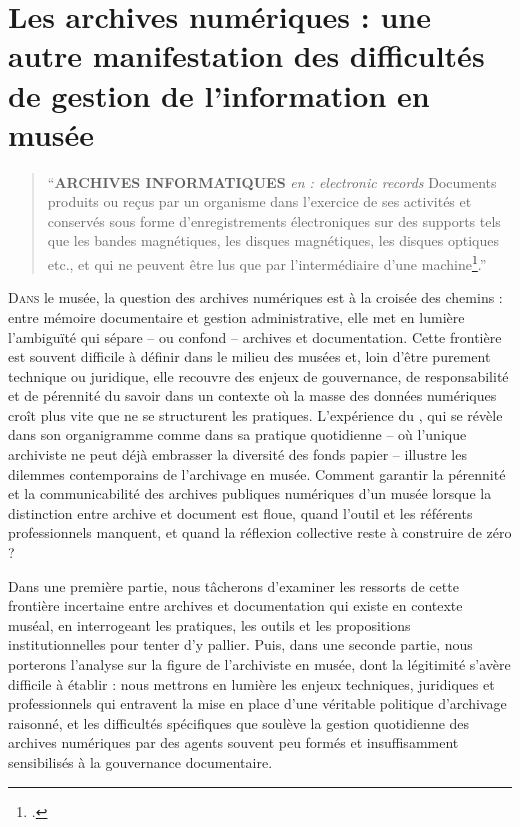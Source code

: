 \chapter[Les archives numériques]{\label{II-C}Les archives numériques : une autre manifestation des difficultés de gestion de l’information en musée }

\begin{quote}
	\enquote{\textbf{ARCHIVES INFORMATIQUES} \textit{en : electronic records}
		Documents produits ou reçus par un organisme dans l'exercice de
		ses activités et conservés sous forme d'enregistrements
		électroniques sur des supports tels que les bandes magnétiques,
		les disques magnétiques, les disques optiques etc., et qui ne
		peuvent être lus que par l’intermédiaire d’une machine\footcite{directiondesarchivesdefranceDictionnaireTerminologieArchivistique2002}.}
\end{quote}

\lettrine{D}{ans} le musée, la question des archives numériques est à la croisée des chemins : entre mémoire documentaire et gestion administrative, elle met en lumière l’ambiguïté qui sépare – ou confond – archives et documentation. Cette frontière est souvent difficile à définir dans le milieu des musées et, loin d’être purement technique ou juridique, elle recouvre des enjeux de gouvernance, de responsabilité et de pérennité du savoir dans un contexte où la masse des données numériques croît plus vite que ne se structurent les pratiques. L’expérience du \mae, qui se révèle dans son organigramme comme dans sa pratique quotidienne – où l’unique archiviste ne peut déjà embrasser la diversité des fonds papier – illustre les dilemmes contemporains de l’archivage en musée. Comment garantir la pérennité et la communicabilité des archives publiques numériques d'un musée lorsque la distinction entre archive et document est floue, quand l’outil et les référents professionnels manquent, et quand la réflexion collective reste à construire de zéro ? 

Dans une première partie, nous tâcherons d'examiner les ressorts de cette frontière incertaine entre archives et documentation qui existe en contexte muséal, en interrogeant les pratiques, les outils et les propositions institutionnelles pour tenter d'y pallier. Puis, dans une seconde partie, nous porterons l’analyse sur la figure de l’archiviste en musée, dont la légitimité s’avère difficile à établir : nous mettrons en lumière les enjeux techniques, juridiques et professionnels qui entravent la mise en place d’une véritable politique d’archivage raisonné, et les difficultés spécifiques que soulève la gestion quotidienne des archives numériques par des agents souvent peu formés et insuffisamment sensibilisés à la gouvernance documentaire.

